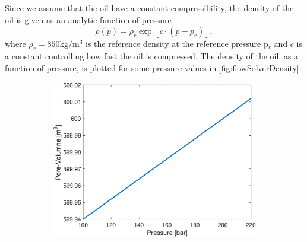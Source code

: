 Since we assume that the oil have a constant compressibility, the density of the oil is given as an analytic function of pressure 
\begin{equation}
    \rho(p) = \rho_r\exp[c\cdot(p-p_r)],
    \label{eq:pressureSolverDensity}
\end{equation}
where $\rho_r = 850\text{kg}/\text{m}^3$ is the reference density at the reference pressure p$_r$ and $c$ is a constant controlling how fast the oil is compressed. The density of the oil, as a function of pressure, is plotted for some pressure values in \autoref{fig:flowSolverDensity}.
\begin{figure}[H]
    \centering
    \begin{subfigure}[t]{0.48\textwidth}
        \includegraphics[width=\textwidth]{figures/flow_solver_pore-volume.eps}
        \caption{}
        \label{fig:flowSolverPoreVolume}
        

\end{subfigure}
\end{figure}
